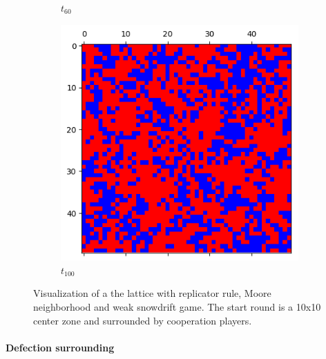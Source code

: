 \documentclass[letterpaper]{article}
\begin{document}
\begin{figure}[H]
\begin{subfigure}{.33\textwidth}
      \caption{$t_{60}$}
    \end{subfigure}
    \begin{subfigure}{.33\textwidth}
      \centering
      \includegraphics[width=1\linewidth]{images/assign2/part32-coop/t100}
      \caption{$t_{100}$}
    \end{subfigure}
    \caption{Visualization of a the lattice with replicator rule,
    Moore neighborhood and weak snowdrift game. The start round is
    a 10x10 center zone and surrounded by cooperation players.}
    \label{fig:visupart32-coop}
\end{figure}


\paragraph{Defection surrounding}
\end{document}
